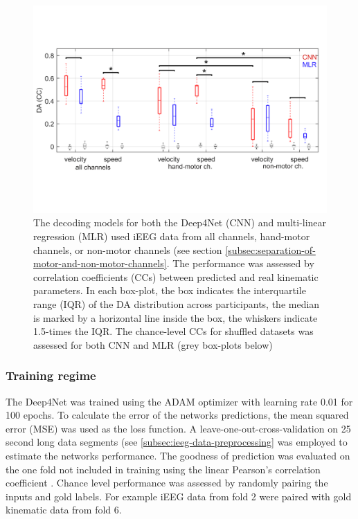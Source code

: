 \begin{figure}[!htpb]
\centering
   \includegraphics[width=0.8\linewidth]{img/ch2/hammer-decoding-acc.pdf}
   \caption[Orignial Deep4Net performance]{The decoding models for both the Deep4Net (CNN) and multi-linear regression (MLR) used iEEG data from all channels, hand-motor channels, or non-motor channels (see section \ref{subsec:separation-of-motor-and-non-motor-channels}. The performance was assessed by correlation coefficients (CCs) between predicted and real kinematic parameters. In each box-plot, the box indicates the interquartile range (IQR) of the DA distribution across participants, the median is marked by a horizontal line inside the box, the whiskers indicate 1.5-times the IQR. The chance-level CCs for shuffled datasets was assessed for both CNN and MLR (grey box-plots below)\cite{Hammer-2021}}
\end{figure}\label{fig:hammer-performance}

\subsubsection{Training regime}
The Deep4Net was trained using the ADAM optimizer \cite{kingma-adam-2017} with learning rate 0.01 for 100 epochs.
To calculate the error of the networks predictions, the mean squared error (MSE) was used as the loss function.
A leave-one-out-cross-validation on 25 second long data segments (see \ref{subsec:ieeg-data-preprocessing} was employed to estimate the networks performance.
The goodness of prediction was evaluated on the one fold not included in training using the linear Pearson's correlation coefficient \cite{pearson-vii-1895}.
Chance level performance was assessed by randomly pairing the inputs and gold labels. For example iEEG data from fold 2 were paired with gold kinematic data from fold 6.

